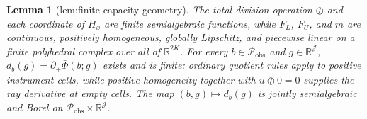 \documentclass{article}
\newtheorem{lemma}{Lemma}
\begin{document}
\begin{lemma}[lem:finite-capacity-geometry]\label{lem:finite-capacity-geometry}
The total division operation \(\oslash\) and each coordinate of \(H_x\) are finite semialgebraic functions, while \(F_L\), \(F_U\), and \(m\) are continuous, positively homogeneous, globally Lipschitz, and piecewise linear on a finite polyhedral complex over all of \(\mathbb R^{2K}\). For every \(b\in\mathcal P_{\mathrm{obs}}\) and \(g\in\mathbb R^{\mathcal J}\), \(d_b(g)=\partial_+\bar\Phi(b;g)\) exists and is finite: ordinary quotient rules apply to positive instrument cells, while positive homogeneity together with \(u\oslash0=0\) supplies the ray derivative at empty cells. The map \((b,g)\mapsto d_b(g)\) is jointly semialgebraic and Borel on \(\mathcal P_{\mathrm{obs}}\times\mathbb R^{\mathcal J}\).
\end{lemma}
\end{document}
